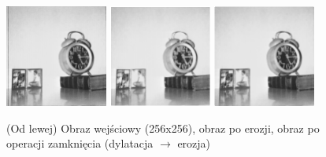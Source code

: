 \documentclass[final,a4paper,openany,12pt]{mwbk}
\begin{document}
\begin{figure}[H]
	\begin{center}
		\includegraphics[width=0.3\textwidth]{1/1Gray_Cl_Original}
		\includegraphics[width=0.3\textwidth]{1/1Gray_Cl_D_Result}
		\includegraphics[width=0.3\textwidth]{1/1Gray_Cl_DE_Result}
	\end{center}
	\caption{(Od lewej) Obraz wejściowy (256x256), obraz po erozji, obraz po operacji zamknięcia (dylatacja $\rightarrow$ erozja)}
\end{figure}
\end{document}
